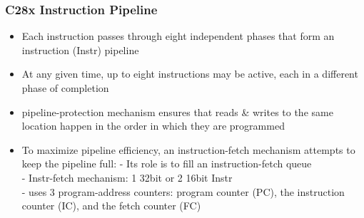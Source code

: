 \begin{minipage}{0.5\textwidth}
\subsubsection{C28x Instruction Pipeline}
\begin{itemize}
  \item Each instruction passes through eight independent phases that form an
instruction (Instr) pipeline
  \item At any given time, up to eight instructions may be active, each in a different
phase of completion
  \item pipeline-protection mechanism ensures that reads \& writes to the same location happen in the order in which they are programmed
  \item To maximize pipeline efficiency, an instruction-fetch mechanism attempts to
keep the pipeline full:
    - Its role is to fill an instruction-fetch queue \\
    - Instr-fetch mechanism: 1 32bit or 2 16bit Instr \\
    - uses 3 program-address counters:
    program counter (PC), the instruction counter (IC), and the fetch counter (FC)
\end{itemize}
\end{minipage}
\begin{minipage}{0.5\textwidth}
\end{minipage}
